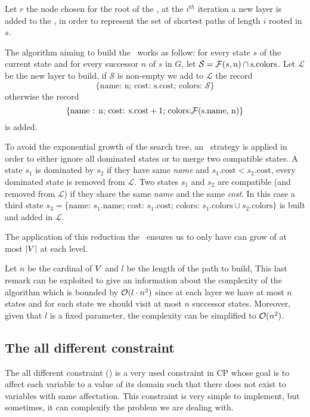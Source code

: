 Let $r$ the node chosen for the root of the \mdd, at the $i^{th}$ iteration a new layer is added to the \mdd, in order to represent the set of shortest paths of length $i$ rooted in $s$.

The algorithm aiming to build the \mdd\ works as follow: for every state $s$ of the current state and for every successor $n$ of $s$ in $G$, let $\mathcal{S} = \mathcal{F}(s, n) \cap \text{s.colors}$. Let $\mathcal{L}$ be the new layer to build, if $\mathcal{S}$ is non-empty we add to $\mathcal{L}$ the record
$$\{\text{name: n; cost: s.cost; colors: } \mathcal{S}\}$$ otherwise the record
$$\{\text{name : n; cost: s.cost} + 1 \text{; colors:} \mathcal{F}(\text{s.name, n})\}$$ is added.

To avoid the exponential growth of the search tree, an \adhoc\ strategy is applied in order to either ignore all dominated states or to merge two compatible states. A state $s_1$ is dominated by $s_2$ if they have same \textit{name} and $s_1.\text{cost} < s_2.\text{cost}$, every dominated state is removed from $\mathcal{L}$. Two states $s_1$ and $s_2$ are compatible (and removed from $\mathcal{L}$) if they share the same \textit{name} and the same \textit{cost}. In this case a third state $s_3 = \{\text{name: } s_1.\text{name; cost: } s_1.\text{cost; colors: } s_1.\text{colors} \cup s_2.\text{colors}\}$ is built and added in $\mathcal{L}$.

The application of this reduction the \mdd\ ensures us to only have can grow of at most $|V|$ at each level.

Let $n$ be the cardinal of $V$ and $l$ be the length of the path to build, This last remark can be exploited to give an information about the complexity of the algorithm which is bounded by $\mathcal{O}(l \cdot n^2)$ since at each layer we have at most $n$ states and for each state we should visit at most $n$ successor states. Moreover, given that $l$ is a fixed parameter, the complexity can be simplified to $\mathcal{O}(n^2)$.



\subsection{The all different constraint}

The all different constraint (\alldiff) is a very used constraint in CP whose goal is to affect each variable to a value of its domain such that there does not exist to variables with same affectation. This constraint is very simple to implement, but sometimes, it can complexify the problem we are dealing with.

